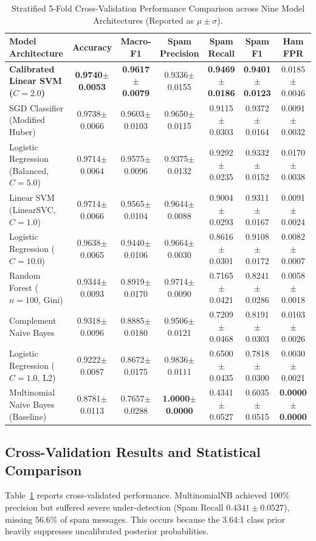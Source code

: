 \documentclass[10pt,onecolumn,letterpaper]{article}
\begin{document}
\begin{table}[htbp]
\centering
\footnotesize
\setlength{\tabcolsep}{4.5pt}
\renewcommand{\arraystretch}{1.08}
\begin{tabularx}{\textwidth}{@{}X c c c c c c@{}}
\toprule
\textbf{Model Architecture} & \textbf{Accuracy} & \textbf{Macro-F1} & \textbf{Spam Precision} & \textbf{Spam Recall} & \textbf{Spam F1} & \textbf{Ham FPR} \\
\midrule
\textbf{Calibrated Linear SVM ($C=2.0$)} & \textbf{0.9740$\pm$0.0053} & \textbf{0.9617$\pm$0.0079} & 0.9336$\pm$0.0155 & \textbf{0.9469$\pm$0.0186} & \textbf{0.9401$\pm$0.0123} & 0.0185$\pm$0.0046 \\
SGD Classifier (Modified Huber) & 0.9738$\pm$0.0066 & 0.9603$\pm$0.0103 & 0.9650$\pm$0.0115 & 0.9115$\pm$0.0303 & 0.9372$\pm$0.0164 & 0.0091$\pm$0.0032 \\
Logistic Regression (Balanced, $C=5.0$) & 0.9714$\pm$0.0064 & 0.9575$\pm$0.0096 & 0.9375$\pm$0.0132 & 0.9292$\pm$0.0235 & 0.9332$\pm$0.0152 & 0.0170$\pm$0.0038 \\
Linear SVM (LinearSVC, $C=1.0$) & 0.9714$\pm$0.0066 & 0.9565$\pm$0.0104 & 0.9644$\pm$0.0088 & 0.9004$\pm$0.0293 & 0.9311$\pm$0.0167 & 0.0091$\pm$0.0024 \\
Logistic Regression ($C=10.0$) & 0.9638$\pm$0.0065 & 0.9440$\pm$0.0106 & 0.9664$\pm$0.0030 & 0.8616$\pm$0.0301 & 0.9108$\pm$0.0172 & 0.0082$\pm$0.0007 \\
Random Forest ($n=100$, Gini) & 0.9344$\pm$0.0093 & 0.8919$\pm$0.0170 & 0.9714$\pm$0.0090 & 0.7165$\pm$0.0421 & 0.8241$\pm$0.0286 & 0.0058$\pm$0.0018 \\
Complement Naive Bayes & 0.9318$\pm$0.0096 & 0.8885$\pm$0.0180 & 0.9506$\pm$0.0121 & 0.7209$\pm$0.0468 & 0.8191$\pm$0.0303 & 0.0103$\pm$0.0026 \\
Logistic Regression ($C=1.0$, L2) & 0.9222$\pm$0.0087 & 0.8672$\pm$0.0175 & 0.9836$\pm$0.0111 & 0.6500$\pm$0.0435 & 0.7818$\pm$0.0300 & 0.0030$\pm$0.0021 \\
Multinomial Naive Bayes (Baseline) & 0.8781$\pm$0.0113 & 0.7657$\pm$0.0288 & \textbf{1.0000$\pm$0.0000} & 0.4341$\pm$0.0527 & 0.6035$\pm$0.0515 & \textbf{0.0000$\pm$0.0000} \\
\bottomrule
\end{tabularx}
\caption{Stratified 5-Fold Cross-Validation Performance Comparison across Nine Model Architectures (Reported as $\mu \pm \sigma$).}
\label{tab:spam_benchmark}
\end{table}

\subsection{Cross-Validation Results and Statistical Comparison}
Table~\ref{tab:spam_benchmark} reports cross-validated performance. MultinomialNB achieved 100\% precision but suffered severe under-detection (Spam Recall $0.4341 \pm 0.0527$), missing 56.6\% of spam messages. This occurs because the 3.64:1 class prior heavily suppresses uncalibrated posterior probabilities.
\end{document}
